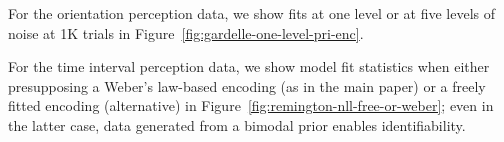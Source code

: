 \documentclass[si.tex]{subfiles}
\begin{document}
For the orientation perception data, we show fits at one level or at five levels of noise at 1K trials in Figure~\ref{fig:gardelle-one-level-pri-enc}.

For the time interval perception data, we show model fit statistics when either presupposing a Weber's law-based encoding (as in the main paper) or a freely fitted encoding (alternative) in Figure~\ref{fig:remington-nll-free-or-weber}; even in the latter case, data generated from a bimodal prior enables identifiability.

\end{document}
